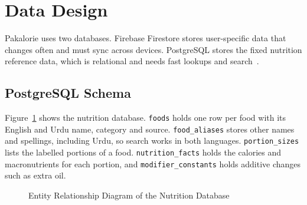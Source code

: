 \section{Data Design}
Pakalorie uses two databases. Firebase Firestore stores user-specific data that changes often and must
sync across devices. PostgreSQL stores the fixed nutrition reference data, which is relational and needs
fast lookups and search~\cite{user_table}.

\subsection{PostgreSQL Schema}
Figure~\ref{fig:erd} shows the nutrition database. \texttt{foods} holds one row per food with its English
and Urdu name, category and source. \texttt{food\_aliases} stores other names and spellings, including
Urdu, so search works in both languages. \texttt{portion\_sizes} lists the labelled portions of a food.
\texttt{nutrition\_facts} holds the calories and macronutrients for each portion, and
\texttt{modifier\_constants} holds additive changes such as extra oil.

\begin{figure}[H]
\centering
{}
\caption{Entity Relationship Diagram of the Nutrition Database}
\label{fig:erd}
\end{figure}

